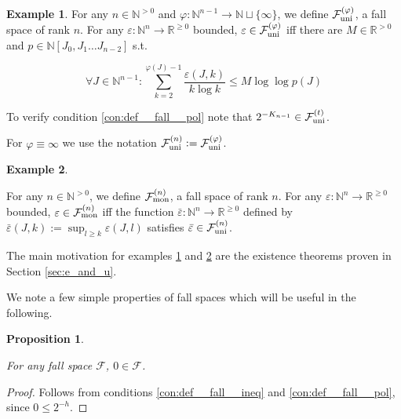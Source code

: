 \documentclass{article}
\numberwithin{equation}{section}
\theoremstyle{definition}
\newtheorem{example}{Example}[section]
\theoremstyle{plain}
\newtheorem{proposition}{Proposition}[section]
\newcommand{\Nats}{\mathbb{N}}
\newcommand{\Reals}{\mathbb{R}}
\newcommand{\NatPolyJ}{\Nats[J_0, J_1 \ldots J_{n-2}]}
\newcommand{\NatFun}{\Nats^n \rightarrow}
\newcommand{\Fall}{\mathcal{F}}
\newcommand{\FallU}{{\Fall_{\textnormal{uni}}^{(n)}}}
\newcommand{\FallUt}[1]{{\Fall_{\textnormal{uni}}^{(#1)}}}
\newcommand{\FallM}{\Fall_{\textnormal{mon}}^{(n)}}
\begin{document}
\begin{samepage}
\begin{example}
\label{exm:e_uni}
For any ${n \in \Nats^{>0}}$ and ${\varphi: \Nats^{n-1} \rightarrow \Nats \sqcup \{ \infty \}}$, we define ${\FallUt{\varphi}}$, a fall space of rank ${n}$. For any ${\varepsilon: \NatFun \Reals^{\geq 0}}$ bounded, $\varepsilon \in \FallUt{\varphi}$ iff there are ${M \in \Reals^{>0}}$ and ${p \in \NatPolyJ}$ s.t.

\begin{equation}
\forall J \in \Nats^{n-1}: \sum_{k=2}^{\varphi(J)-1}\frac{\varepsilon(J,k)}{k \log k} \leq M \log \log p(J)
\end{equation}

To verify condition \ref{con:def__fall__pol} note that ${2^{-K_{n-1}} \in \FallUt{t}}$.

For ${\varphi \equiv \infty}$ we use the notation ${\FallU:=\FallUt{\varphi}}$.

\end{example}
\end{samepage}

\begin{samepage}
\begin{example}
\label{exm:e_mon}

For any ${n \in \Nats^{>0}}$, we define ${\FallM}$, a fall space of rank ${n}$. For any ${\varepsilon: \NatFun \Reals^{\geq 0}}$ bounded, $\varepsilon \in \FallM$ iff the function ${\bar{\varepsilon}: \NatFun \Reals^{\geq 0}}$ defined by ${\bar{\varepsilon}(J,k):=\sup_{l \geq k} \varepsilon(J,l)}$ satisfies ${\bar{\varepsilon} \in \FallU}$.

\end{example}
\end{samepage}

The main motivation for examples \ref{exm:e_uni} and \ref{exm:e_mon} are the existence theorems proven in Section \ref{sec:e_and_u}.

We note a few simple properties of fall spaces which will be useful in the following.

\begin{proposition}
\label{prp:err_spc_zero}

For any fall space $\Fall$, $0 \in \Fall$.

\end{proposition}

\begin{proof}

Follows from conditions \ref{con:def__fall__ineq} and \ref{con:def__fall__pol}, since $0 \leq 2^{-h}$.
\end{proof}
\end{document}
